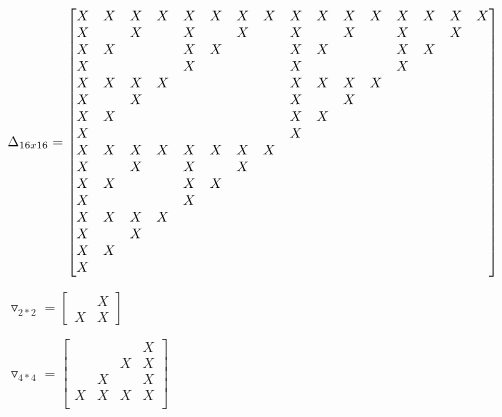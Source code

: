 \documentclass[10pt]{book}
\begin{document}
\begin{mdSnippets}
\begin{mdInlineSnippet}[c0fbe0f02253be7138dd578dd01bb0de]
$ \setcounter{MaxMatrixCols}{20}\Delta_{16x16} = \begin{bmatrix}X & X & X & X & X & X & X & X & X & X & X & X & X & X & X & X\\X & ~ & X & ~ & X & ~ & X & ~ & X & ~ & X & ~ & X & ~ & X & ~\\X & X & ~ & ~ & X & X & ~ & ~ & X & X & ~ & ~ & X & X & ~ & ~\\X & ~ & ~ & ~ & X & ~ & ~ & ~ & X & ~ & ~ & ~ & X & ~ & ~ & ~\\X & X & X & X & ~ & ~ & ~ & ~ & X & X & X & X & ~ & ~ & ~ & ~\\X & ~ & X & ~ & ~ & ~ & ~ & ~ & X & ~ & X & ~ & ~ & ~ & ~ & ~\\X & X & ~ & ~ & ~ & ~ & ~ & ~ & X & X & ~ & ~ & ~ & ~ & ~ & ~\\X & ~ & ~ & ~ & ~ & ~ & ~ & ~ & X & ~ & ~ & ~ & ~ & ~ & ~ & ~\\X & X & X & X & X & X & X & X & ~ & ~ & ~ & ~ & ~ & ~ & ~ & ~\\X & ~ & X & ~ & X & ~ & X & ~ & ~ & ~ & ~ & ~ & ~ & ~ & ~ & ~\\X & X & ~ & ~ & X & X & ~ & ~ & ~ & ~ & ~ & ~ & ~ & ~ & ~ & ~\\X & ~ & ~ & ~ & X & ~ & ~ & ~ & ~ & ~ & ~ & ~ & ~ & ~ & ~ & ~\\X & X & X & X & ~ & ~ & ~ & ~ & ~ & ~ & ~ & ~ & ~ & ~ & ~ & ~\\X & ~ & X & ~ & ~ & ~ & ~ & ~ & ~ & ~ & ~ & ~ & ~ & ~ & ~ & ~\\X & X & ~ & ~ & ~ & ~ & ~ & ~ & ~ & ~ & ~ & ~ & ~ & ~ & ~ & ~\\X & ~ & ~ & ~ & ~ & ~ & ~ & ~ & ~ & ~ & ~ & ~ & ~ & ~ & ~ & ~\\  \end{bmatrix}$\end{mdInlineSnippet}%
\begin{mdInlineSnippet}[f1ce76812b67ae0ee9749e146fb4bdff]%
$\triangledown_{2*2}=\begin{bmatrix}& X\\X & X \end{bmatrix}$\end{mdInlineSnippet}%
\begin{mdInlineSnippet}[4e70e1c58f9342c2c3714a85d9fa50d7]%
$\triangledown_{4*4}=\begin{bmatrix}&   &   & X\\&   & X & X\\& X &   & X\\X & X & X & X\\ \end{bmatrix}$\end{mdInlineSnippet}%

\end{mdSnippets}
\end{document}
